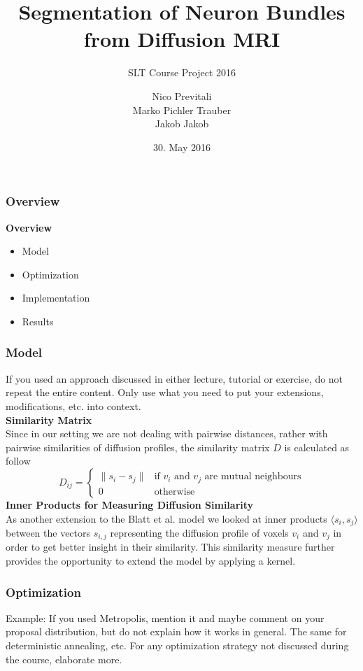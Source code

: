 \documentclass{beamer}
\title{\textbf{Segmentation of Neuron Bundles from Diffusion MRI}}
\subtitle{SLT Course Project 2016}
\author{ Nico Previtali \\ Marko Pichler Trauber \\ Jakob Jakob}
\date{30. May 2016}
\institute[ETH Zürich]
\begin{document}
\begin{frame}
 \titlepage
\end{frame}


\begin{frame}
\frametitle{Overview}
\textbf{Overview}
\begin{itemize}
	\item Model
	\item Optimization
	\item Implementation
	\item Results
\end{itemize}
\end{frame}

\begin{frame}
\frametitle{Model}
If you used an approach discussed in either lecture, tutorial or exercise, do not repeat the entire content. Only use what you need to put your extensions, modifications, etc. into context.
\\
\textbf{Similarity Matrix}
\\ Since in our setting we are not dealing with pairwise distances, rather with pairwise similarities of diffusion profiles, the similarity matrix $D$ is calculated as follow
\begin{equation*} 
	D_{ij} = 
	\begin{cases}
		\lVert s_i - s_j \rVert & \text{if $v_i$ and $v_j$ are mutual neighbours} \\
		0 & \text{otherwise}
	\end{cases}
\end{equation*}
\textbf{Inner Products for Measuring Diffusion Similarity}
\\ As another extension to the Blatt et al. \cite{blatt1997data} model we looked at inner products $\langle s_i, s_j \rangle$ between the vectors $s_{i, j}$ representing the diffusion profile of voxels $v_i$ and $v_j$ in order to get better insight in their similarity. This similarity measure further provides the opportunity to extend the model by applying a kernel. 
\end{frame}


\begin{frame}
\frametitle{Optimization}

Example: If you used Metropolis, mention it and maybe comment on your proposal distribution, but do not explain how it works in general. The same for deterministic annealing, etc. For any optimization strategy not discussed during the course, elaborate more.


\end{frame}
\end{document}
